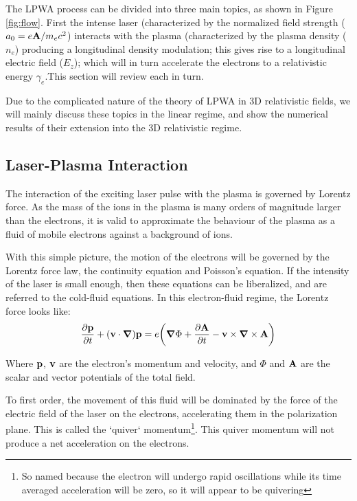 \documentclass[12pt,letter]{article}
\begin{document}
The LPWA process can be divided into three main topics, as shown in Figure
\ref{fig:flow}. First the intense laser (characterized
by the normalized field strength ($a_0 = e\vb{A}/m_e c^2$) interacts with the
plasma (characterized by the plasma density ($n_e$) producing a longitudinal
density modulation; this gives rise to a longitudinal electric field ($E_z$);
which will in turn accelerate the electrons to a relativistic energy
$\gamma_e$.This section will review each in turn.

Due to the complicated nature of the theory of LPWA in 3D relativistic fields, we will mainly
discuss these topics in the linear regime, and show the numerical results of
their extension into the 3D relativistic regime.

\subsection{Laser-Plasma Interaction}
 The interaction of the exciting laser
pulse with the plasma is governed by Lorentz force\cite{jackson}. As the
mass of the ions in the plasma is many orders of magnitude larger than the
electrons, it is valid to approximate the behaviour of the plasma as a fluid of
mobile electrons against a background of ions.

With this simple picture, the motion of the electrons will be governed by the
Lorentz force law, the continuity equation and Poisson's equation. If the
intensity of the laser is small enough, then these equations can be
liberalized, and are referred to the cold-fluid
equations\cite{gorbunov1987excitation}.
In this electron-fluid regime, the Lorentz force looks like:
\begin{align}
    \label{eq:fullLPWA}
    \pdv{\vb{p}}{t} +(\vb{v} \cdot \grad)\vb{p} = e \qty( \grad \Phi
    +\pdv{\vb{A}}{t} - \vb{v}\times \grad \times \vb{A} )
\end{align}

Where $\vb{p}$, $\vb{v}$ are the electron's momentum and velocity, and $\Phi$
and $\vb{A}$ are the scalar and vector potentials of the total field.

To first order, the movement of this fluid will be dominated by the force of the
electric field of the laser on the electrons, accelerating them in the polarization
plane. This is called the `quiver` momentum\footnote{So named because the electron will
undergo rapid oscillations while its time averaged acceleration will be zero, so it will appear to be quivering}. This quiver momentum will not produce a net acceleration on the 
electrons.
\end{document}
